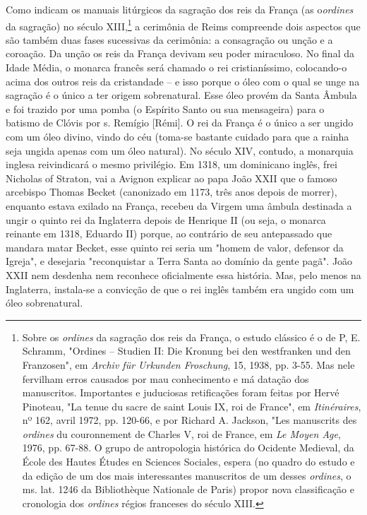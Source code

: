 \documentclass[a5paper]{book}
\begin{document}
Como indicam os manuais litúrgicos da sagração dos reis da França (as o\textit{ordines} da sagração) no século XIII,\footnote{Sobre os \textit{ordines} da sagração dos reis da França, o estudo clássico é o de P, E. Schramm, "Ordines -- Studien II: Die Kronung bei den westfranken und den Franzosen", em \textit{Archiv für Urkunden Froschung}, 15, 1938, pp. 3-55. Mas nele fervilham erros causados por mau conhecimento e má datação dos manuscritos. Importantes e juduciosas retif{\kern0pt}icações foram feitas por Hervé Pinoteau, "La tenue du sacre de saint Louis IX, roi de France", em \textit{Itinéraires}, nº 162, avril 1972, pp. 120-66, e por Richard A. Jackson, "Les manuscrits des \textit{ordines} du couronnement de Charles V, roi de France, em \textit{Le Moyen Age}, 1976, pp. 67-88. O grupo de antropologia histórica do Ocidente Medieval, da École des Hautes Études en Sciences Sociales, espera (no quadro do estudo e da edição de um dos mais interessantes manuscritos de um desses \textit{ordines}, o ms. lat. 1246 da Bibliothèque Nationale de Paris) propor nova classif{\kern0pt}icação e cronologia dos \textit{ordines} régios franceses do século XIII.} a cerimônia de Reims compreende dois aspectos que são também duas fases sucessivas da cerimônia: a consagração ou unção e a coroação. Da unção os reis da França devivam seu poder miraculoso. No f{\kern0pt}inal da Idade Média, o monarca francês será chamado o rei cristianíssimo, colocando-o acima dos outros reis da cristandade -- e isso porque o óleo com o qual se unge na sagração é o único a ter origem sobrenatural. Esse óleo provém da Santa Âmbula e foi trazido por uma pomba (o Espírito Santo ou sua mensageira) para o batismo de Clóvis por s. Remígio [Rémi]. O rei da França é o único a ser ungido com um óleo divino, vindo do céu (toma-se bastante cuidado para que a rainha seja ungida apenas com um óleo natural). No século XIV, contudo, a monarquia inglesa reivindicará o mesmo privilégio. Em 1318, um dominicano inglês, frei Nicholas of Straton, vai a Avignon explicar ao papa João XXII que o famoso arcebispo Thomas Becket (canonizado em 1173, três anos depois de morrer), enquanto estava exilado na França, recebeu da Virgem uma âmbula destinada a ungir o quinto rei da Inglaterra depois de Henrique II (ou seja, o monarca reinante em 1318, Eduardo II) porque, ao contrário de seu antepassado que mandara matar Becket, esse quinto rei seria um "homem de valor, defensor da Igreja", e desejaria "reconquistar a Terra Santa ao domínio da gente pagã". João XXII nem desdenha nem reconhece of{\kern0pt}icialmente essa história. Mas, pelo menos na Inglaterra, instala-se a convicção de que o rei inglês também era ungido com um óleo sobrenatural.
\end{document}
